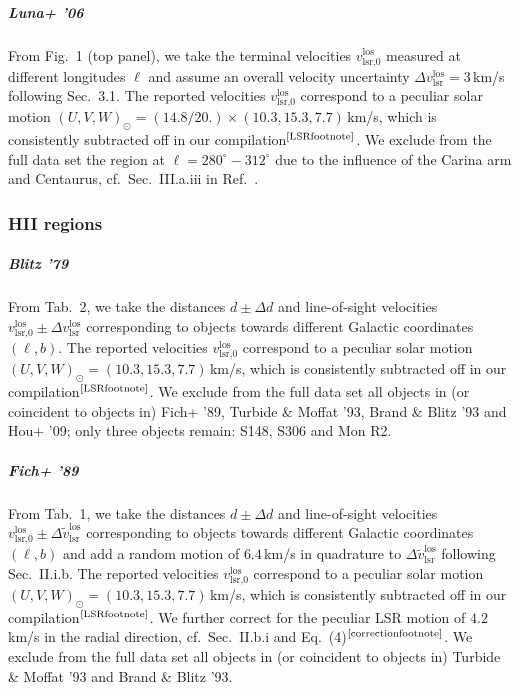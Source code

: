 \documentclass[twocolumn,prd,reprint,preprintnumbers,amsmath,amssymb,superscriptaddress,nofootinbib]{revtex4}
\begin{document}
\subparagraph{Luna+ '06 \cite{Luna2006}} From Fig.~1 (top panel), we take the terminal velocities $v_{\textrm{lsr,0}}^{\textrm{los}}$ measured at different longitudes $\ell$ and assume an overall velocity uncertainty $\Delta v_{\textrm{lsr}}^{\textrm{los}}=3\,$km/s following Sec.~3.1. The reported velocities $v_{\textrm{lsr,0}}^{\textrm{los}}$ correspond to a peculiar solar motion $(U,V,W)_{\odot}=(14.8/20.)\times(10.3,15.3,7.7)\,$km/s, which is consistently subtracted off in our compilation$^\text{\ref{LSRfootnote}}$. We exclude from the full data set the region at $\ell=280^{\circ}-312^{\circ}$ due to the influence of the Carina arm and Centaurus, cf.~Sec.~III.a.iii in Ref.~\cite{Alvarez1990}.


\subsubsection{HII regions}

\subparagraph{Blitz '79 \cite{Blitz1979}} From Tab.~2, we take the distances $d\pm \Delta d$ and line-of-sight velocities $v_{\textrm{lsr,0}}^{\textrm{los}}\pm \Delta v_{\textrm{lsr}}^{\textrm{los}}$ corresponding to objects towards different Galactic coordinates $(\ell,b)$. The reported velocities $v_{\textrm{lsr,0}}^{\textrm{los}}$ correspond to a peculiar solar motion $(U,V,W)_{\odot}=(10.3,15.3,7.7)\,$km/s, which is consistently subtracted off in our compilation$^\text{\ref{LSRfootnote}}$. We exclude from the full data set all objects in (or coincident to objects in) Fich+ '89, Turbide \& Moffat '93, Brand \& Blitz '93 and Hou+ '09; only three objects remain: S148, S306 and Mon R2.

\subparagraph{Fich+ '89 \cite{Fich1989}} From Tab.~1, we take the distances $d\pm \Delta d$ and line-of-sight velocities $v_{\textrm{lsr,0}}^{\textrm{los}}\pm \Delta \tilde{v}_{\textrm{lsr}}^{\textrm{los}}$ corresponding to objects towards different Galactic coordinates $(\ell,b)$ and add a random motion of $6.4\,$km/s in quadrature to $\Delta \tilde{v}_{\textrm{lsr}}^{\textrm{los}}$ following Sec.~II.i.b. The reported velocities $v_{\textrm{lsr,0}}^{\textrm{los}}$ correspond to a peculiar solar motion $(U,V,W)_{\odot}=(10.3,15.3,7.7)\,$km/s, which is consistently subtracted off in our compilation$^\text{\ref{LSRfootnote}}$. We further correct for the peculiar LSR motion of $4.2\,$km/s in the radial direction, cf.~Sec.~II.b.i and Eq.~(4)$^\text{\ref{correctionfootnote}}$. We exclude from the full data set all objects in (or coincident to objects in) Turbide \& Moffat '93 and Brand \& Blitz '93.
\end{document}
